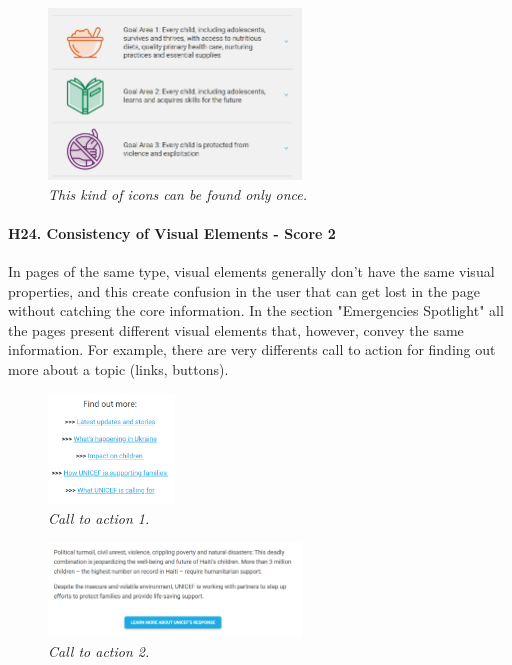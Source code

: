 \begin{figure}[h]
	\centering
	\begin{center}
		\includegraphics[width=0.6\textwidth]{Picture25.png}
	\end{center}
	\captionsetup{font=small}
	\caption{\textit{This kind of icons can be found only once.}}
	\label{fig:label23}
\end{figure}

\paragraph*{H24. Consistency of Visual Elements  - Score 2}
In pages of the same type, visual elements generally don’t have the same visual properties, and this create confusion in the user that can get lost in the page without catching the core information.
In the section "Emergencies Spotlight" all the pages present different visual elements that, however, convey the same information. For example, there are very differents call to action for finding out more about a topic (links, buttons).

\begin{figure}[h]
	\centering
	\begin{center}
		\includegraphics[width=0.3\textwidth]{Picture27.png}
	\end{center}
	\captionsetup{font=small}
	\caption{\textit{Call to action 1.}}
	\label{fig:label23}
\end{figure}

\begin{figure}[h]
	\centering
	\begin{center}
		\includegraphics[width=0.6\textwidth]{Picture28.png}
	\end{center}
	\captionsetup{font=small}
	\caption{\textit{Call to action 2.}}
	\label{fig:label23}
\end{figure}

